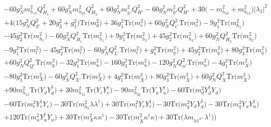 \begin{align}
 &-60 g_{N}^{2} m_{h_{13}}^2 Q_{H_1}^{2} +60 g_{N}^{2} m_{h_{23}}^2 Q_{H_2}^{2} +60 g_{N}^{2} m_{\bar{h'}}^2 Q_{\bar{H}'}^{2} -60 g_{N}^{2} m_{h'}^2 Q_{H'}^{2} +30 \Big(- m_{h_{23}}^2  + m_{h_{13}}^2\Big)|\lambda_3|^2 \nonumber \\ 
 &+4 \Big(15 g_{N}^{2} Q_{d'}^{2}  + 20 g_{3}^{2}  + g_{1}^{2}\Big)\mbox{Tr}\Big({m_d^2}\Big) +36 g_{1}^{2} \mbox{Tr}\Big({m_e^2}\Big) +60 g_{N}^{2} Q_{e'}^{2} \mbox{Tr}\Big({m_e^2}\Big) -9 g_{1}^{2} \mbox{Tr}\Big({m_{h_1}^2}\Big) \nonumber \\ 
 &-45 g_{2}^{2} \mbox{Tr}\Big({m_{h_1}^2}\Big) -60 g_{N}^{2} Q_{H_1}^{2} \mbox{Tr}\Big({m_{h_1}^2}\Big) +9 g_{1}^{2} \mbox{Tr}\Big({m_{h_2}^2}\Big) +45 g_{2}^{2} \mbox{Tr}\Big({m_{h_2}^2}\Big) +60 g_{N}^{2} Q_{H_2}^{2} \mbox{Tr}\Big({m_{h_2}^2}\Big) \nonumber \\ 
 &-9 g_{1}^{2} \mbox{Tr}\Big({m_l^2}\Big) -45 g_{2}^{2} \mbox{Tr}\Big({m_l^2}\Big) -60 g_{N}^{2} Q_{L'}^{2} \mbox{Tr}\Big({m_l^2}\Big) +g_{1}^{2} \mbox{Tr}\Big({m_q^2}\Big) +45 g_{2}^{2} \mbox{Tr}\Big({m_q^2}\Big) +80 g_{3}^{2} \mbox{Tr}\Big({m_q^2}\Big) \nonumber \\ 
 &+60 g_{N}^{2} Q_{Q'}^{2} \mbox{Tr}\Big({m_q^2}\Big) -32 g_{1}^{2} \mbox{Tr}\Big({m_u^2}\Big) -160 g_{3}^{2} \mbox{Tr}\Big({m_u^2}\Big) -120 g_{N}^{2} Q_{u'}^{2} \mbox{Tr}\Big({m_u^2}\Big) -4 g_{1}^{2} \mbox{Tr}\Big({m_{X}^2}\Big) \nonumber \\ 
 &-80 g_{3}^{2} \mbox{Tr}\Big({m_{X}^2}\Big) -60 g_{N}^{2} Q_{X'}^{2} \mbox{Tr}\Big({m_{X}^2}\Big) +4 g_{1}^{2} \mbox{Tr}\Big({m_{\bar{X}}^2}\Big) +80 g_{3}^{2} \mbox{Tr}\Big({m_{\bar{X}}^2}\Big) +60 g_{N}^{2} Q_{\bar{X}}^{2} \mbox{Tr}\Big({m_{\bar{X}}^2}\Big) \nonumber \\ 
 &+90 m_{h_{13}}^2 \mbox{Tr}\Big({Y_d  Y_{d}^{\dagger}}\Big) +30 m_{h_{13}}^2 \mbox{Tr}\Big({Y_e  Y_{e}^{\dagger}}\Big) -90 m_{h_{23}}^2 \mbox{Tr}\Big({Y_u  Y_{u}^{\dagger}}\Big) -60 \mbox{Tr}\Big({m_d^2  Y_{d}^{\dagger}  Y_d}\Big) \nonumber \\ 
 &-60 \mbox{Tr}\Big({m_e^2  Y_{e}^{\dagger}  Y_e}\Big) -30 \mbox{Tr}\Big({m_{h_2}^2  \lambda  \lambda^{\dagger}}\Big) +30 \mbox{Tr}\Big({m_l^2  Y_e  Y_{e}^{\dagger}}\Big) -30 \mbox{Tr}\Big({m_q^2  Y_d  Y_{d}^{\dagger}}\Big) -30 \mbox{Tr}\Big({m_q^2  Y_u  Y_{u}^{\dagger}}\Big) \nonumber \\ 
 &+120 \mbox{Tr}\Big({m_u^2  Y_{u}^{\dagger}  Y_u}\Big) +30 \mbox{Tr}\Big({m_{X}^2  \kappa  \kappa^{\dagger}}\Big) -30 \mbox{Tr}\Big({m_{\bar{X}}^2  \kappa^{\dagger}  \kappa}\Big) +30 \mbox{Tr}\Big({\lambda  m_{{h 1}^{2 *}}  \lambda^{\dagger}}\Big) \Big)\\ 

\end{align}
